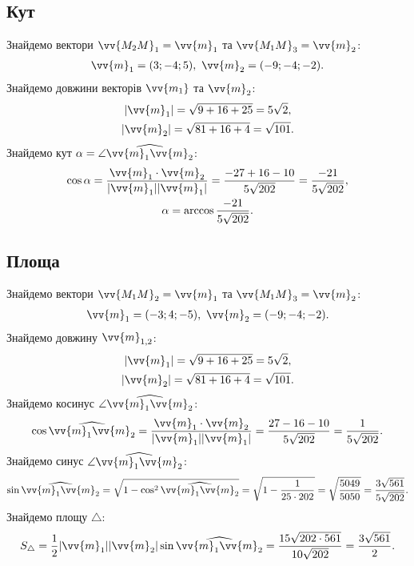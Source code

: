 \subsection{Кут}
\solving
Знайдемо вектори \(\vv{M_2M}_1=\vv{m}_1\) та \(\vv{M_1M}_3=\vv{m}_2\):
\begin{gather}
	\vv{m}_1=(3;-4;5),\ \vv{m}_2=(-9;-4;-2).
\end{gather}
Знайдемо довжини векторів \(\vv{m_1}\) та \(\vv{m}_2\):
\begin{gather}
	\lvert\vv{m}_1\rvert=\sqrt{9+16+25}=5\sqrt{2},\\
	\lvert\vv{m}_2\rvert=\sqrt{81+16+4}=\sqrt{101}.
\end{gather}
Знайдемо кут \(\alpha=\angle\widehat{\vv{m}_1\vv{m}_2}\):
\begin{gather}
	\cos\alpha=\frac{\vv{m}_1\cdot\vv{m}_2}{\lvert\vv{m}_1\rvert\lvert\vv{m}_1\rvert}=\frac{-27+16-10}{5\sqrt{202}}=\frac{-21}{5\sqrt{202}},\\
	\alpha=\arccos\frac{-21}{5\sqrt{202}}.
\end{gather}
\subsection{Площа}
\solving
Знайдемо вектори \(\vv{M_1M}_2=\vv{m}_1\) та \(\vv{M_1M}_3=\vv{m}_2\):
\begin{gather}
	\vv{m}_1=(-3;4;-5),\ \vv{m}_2=(-9;-4;-2).
\end{gather}
Знайдемо довжину \(\vv{m}_{1,2}\):
\begin{gather}
		\lvert\vv{m}_1\rvert=\sqrt{9+16+25}=5\sqrt{2},\\
	\lvert\vv{m}_2\rvert=\sqrt{81+16+4}=\sqrt{101}.
\end{gather}
Знайдемо косинус \(\angle\widehat{\vv{m}_1\vv{m}_2}\):
\begin{gather}
	\cos\widehat{\vv{m}_1\vv{m}_2}=\frac{\vv{m}_1\cdot\vv{m}_2}{\lvert\vv{m}_1\rvert\lvert\vv{m}_1\rvert}=\frac{27-16-10}{5\sqrt{202}}=\frac{1}{5\sqrt{202}}.
\end{gather}
Знайдемо синус \(\angle\widehat{\vv{m}_1\vv{m}_2}\):
\begin{gather}
	\sin\widehat{\vv{m}_1\vv{m}_2}=\sqrt{1-\cos^2\widehat{\vv{m}_1\vv{m}_2}}=\sqrt{1-\frac{1}{25\cdot202}}=\sqrt{\frac{5049}{5050}}=\frac{3\sqrt{561}}{5\sqrt{202}}.
\end{gather}
Знайдемо площу \(\triangle\):
\begin{gather}
	S_\triangle=\frac{1}{2}\lvert\vv{m}_1\rvert\lvert\vv{m}_2\rvert\sin\widehat{\vv{m}_1\vv{m}_2}
	=\frac{15\sqrt{202\cdot 561}}{10\sqrt{202}}=\frac{3\sqrt{561}}{2}.
\end{gather}
